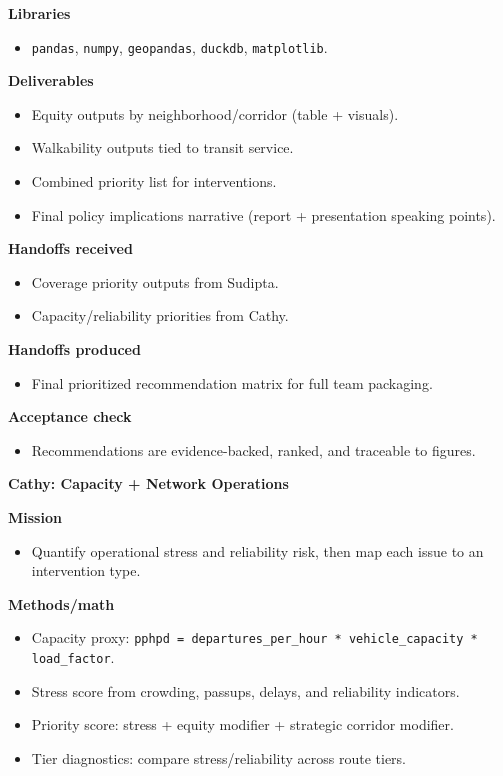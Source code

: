 \documentclass[10pt,letterpaper,twocolumn]{article}
\newcommand{\subhead}[1]{\textbf{#1}}
\begin{document}
\subhead{Libraries}
\begin{itemize}
  \item \texttt{pandas}, \texttt{numpy}, \texttt{geopandas}, \texttt{duckdb}, \texttt{matplotlib}.
\end{itemize}

\subhead{Deliverables}
\begin{itemize}
  \item Equity outputs by neighborhood/corridor (table + visuals).
  \item Walkability outputs tied to transit service.
  \item Combined priority list for interventions.
  \item Final policy implications narrative (report + presentation speaking points).
\end{itemize}

\subhead{Handoffs received}
\begin{itemize}
  \item Coverage priority outputs from Sudipta.
  \item Capacity/reliability priorities from Cathy.
\end{itemize}

\subhead{Handoffs produced}
\begin{itemize}
  \item Final prioritized recommendation matrix for full team packaging.
\end{itemize}

\subhead{Acceptance check}
\begin{itemize}
  \item Recommendations are evidence-backed, ranked, and traceable to figures.
\end{itemize}

\vspace{0.4em}
\subhead{Cathy: Capacity + Network Operations}

\subhead{Mission}
\begin{itemize}
  \item Quantify operational stress and reliability risk, then map each issue to an intervention type.
\end{itemize}

\subhead{Methods/math}
\begin{itemize}
  \item Capacity proxy: \texttt{pphpd = departures\_per\_hour * vehicle\_capacity * load\_factor}.
  \item Stress score from crowding, passups, delays, and reliability indicators.
  \item Priority score: stress + equity modifier + strategic corridor modifier.
  \item Tier diagnostics: compare stress/reliability across route tiers.
\end{itemize}
\end{document}
